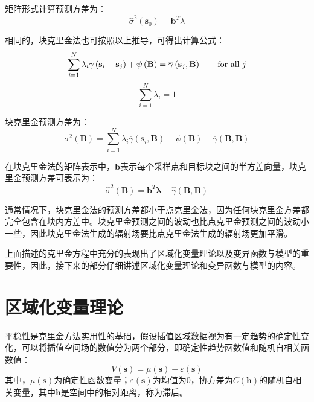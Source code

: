 矩阵形式计算预测方差为：
\begin{equation}
    \hat{\sigma}^{2} \left( \mathbf{s}_{0} \right) = \mathbf{b}^{T} \lambda
    \label{点克里金方程矩阵形式计算预测方差}
\end{equation}

相同的，块克里金法也可按照以上推导，可得出计算公式：
\begin{equation}
    \sum_{i=1}^{N} \lambda_{i} \gamma \left( \mathbf{s}_{i} - \mathbf{s}_{j} \right) + \psi \left( \mathbf{B} \right) = \overline{\gamma} \left( \mathbf{s}_{j} , \mathbf{B} \right) \qquad \text{for all $ j $}
\end{equation}
\begin{equation}
    \sum_{i=1}^{N} \lambda_{i} = 1
\end{equation}

块克里金预测方差为：
\begin{equation}
    \sigma^{2}\left( \mathbf{B} \right) = \sum_{i=1}^{N} \lambda_{i} \overline{\gamma} \left( \mathbf{s}_{i} , \mathbf{B} \right) + \psi \left( \mathbf{B} \right) - \overline{\gamma} \left( \mathbf{B} , \mathbf{B} \right)
\end{equation}

在块克里金法的矩阵表示中，$ \mathbf{b} $表示每个采样点和目标块之间的半方差向量，块克里金预测方差可表示为：
\begin{equation}
    \hat{\sigma}^{2} \left( \mathbf{B} \right) = \mathbf{b}^{T} \mathbf{\lambda} - \hat{\gamma} \left( \mathbf{B} , \mathbf{B} \right)
\end{equation}

通常情况下，块克里金法的预测方差都小于点克里金法，因为任何块克里金方差都完全包含在块内方差中。块克里金预测之间的波动也比点克里金预测之间的波动小一些，因此块克里金法生成的辐射场要比点克里金法生成的辐射场更加平滑。

上面描述的克里金方程中充分的表现出了区域化变量理论以及变异函数与模型的重要性，因此，接下来的部分仔细讲述区域化变量理论和变异函数与模型的内容。

\section{区域化变量理论}
平稳性是克里金方法实用性的基础，假设插值区域数据视为有一定趋势的确定性变化，可以将插值空间场的数值分为两个部分，即确定性趋势函数值和随机自相关函数值：
\begin{equation}
    V \left( \mathbf{s} \right) = \mu \left( \mathbf{s} \right) + \varepsilon \left( \mathbf{s} \right)
    \label{区域化变量}
\end{equation}
其中，$ \mu \left( \mathbf{s} \right) $为确定性函数变量；$ \varepsilon \left( \mathbf{s} \right) $为均值为0，协方差为$ C\left( \mathbf{h} \right) $的随机自相关变量，其中$ \mathbf{h} $是空间中的相对距离，称为滞后。

